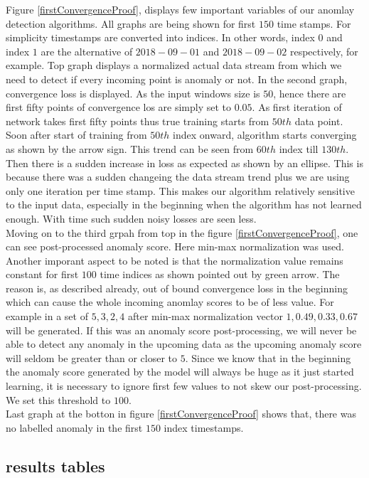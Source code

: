 \documentclass[12pt]{article}
\begin{document}
Figure \ref{firstConvergenceProof}, displays few important variables of our anomlay detection algorithms. All graphs are being shown for first $150$ time stamps. For simplicity timestamps are converted into indices. In other words, index $0$ and index $1$ are the alternative of $2018-09-01$ and $2018-09-02$ respectively, for example. Top graph displays a normalized actual data stream from which we need to detect if every incoming point is anomaly or not. In the second graph, convergence loss is displayed. As the input windows size is $50$, hence there are first fifty points of convergence los are simply set to $0.05$. As first iteration of network takes first fifty points thus true training starts from $50th$ data point. Soon after start of training from $50th$ index onward, algorithm starts converging as shown by the arrow sign. This trend can be seen from $60th$ index till $130th$. Then there is a sudden increase in loss as expected as shown by an ellipse. This is because there was a sudden changeing the data stream trend plus we are using only one iteration per time stamp. This makes our algorithm relatively sensitive to the input data, especially in the beginning when the algorithm has not learned enough. With time such  sudden noisy losses are seen less.\\
\break
Moving on to the third grpah from top in the figure \ref{firstConvergenceProof}, one can see post-processed anomaly score. Here min-max normalization was used. Another imporant aspect to be noted is that the normalization value remains constant for first $100$ time indices as shown pointed out by green arrow. The reason is, as described already, out of bound convergence loss in the beginning which can cause the whole incoming anomlay scores to be of less value. For example in a set of ${5,3,2,4}$ after min-max normalization vector ${1,0.49,0.33,0.67}$ will be generated. If this was an anomaly score post-processing, we will never be able to detect any anomaly in the upcoming data as the upcoming anomaly score will seldom be greater than or closer to $5$. Since we know that in the beginning the anomaly score generated by the model will always be huge as it just started learning, it is necessary to ignore first few values to not skew our post-processing. We set this threshold to $100$.\\
\break
Last graph at the botton in figure \ref{firstConvergenceProof} shows that, there was no labelled anomaly in the first $150$ index timestamps. 
\subsection{results tables}
\end{document}
